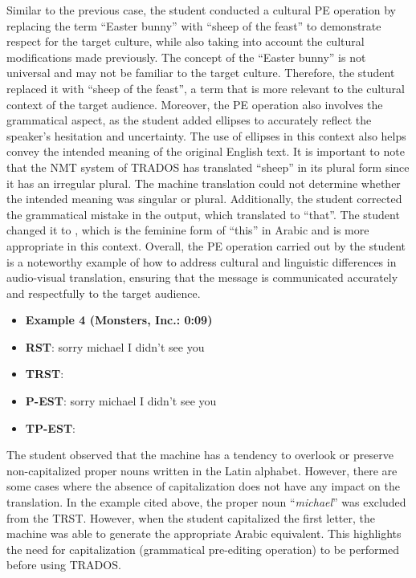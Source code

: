 \documentclass[english]{textolivre}
\begin{document}
Similar to the previous case, the student conducted a cultural PE operation by replacing the term “Easter bunny” with “sheep of the feast” to demonstrate respect for the target culture, while also taking into account the cultural modifications made previously. The concept of the “Easter bunny” is not universal and may not be familiar to the target culture. Therefore, the student replaced it with “sheep of the feast”, a term that is more relevant to the cultural context of the target audience. Moreover, the PE operation also involves the grammatical aspect, as the student added ellipses to accurately reflect the speaker’s hesitation and uncertainty. The use of ellipses in this context also helps convey the intended meaning of the original English text. It is important to note that the NMT system of TRADOS has translated “sheep” in its plural form since it has an irregular plural. The machine translation could not determine whether the intended meaning was singular or plural. Additionally, the student corrected the grammatical mistake in the output, which translated  to “that”. The student changed it to , which is the feminine form of “this” in Arabic and is more appropriate in this context. Overall, the PE operation carried out by the student is a noteworthy example of how to address cultural and linguistic differences in audio-visual translation, ensuring that the message is communicated accurately and respectfully to the target audience.

\begin{itemize}
\item \textbf{Example 4 (Monsters, Inc.: 0:09)}
\item \textbf{RST}: sorry michael I didn't see you
\item \textbf{TRST}: 
\item \textbf{P-EST}: sorry michael I didn't see you
\item \textbf{TP-EST}: 
\end{itemize}

The student observed that the machine has a tendency to overlook or preserve non-capitalized proper nouns written in the Latin alphabet. However, there are some cases where the absence of capitalization does not have any impact on the translation. In the example cited above, the proper noun “\emph{michael}” was excluded from the TRST. However, when the student capitalized the first letter, the machine was able to generate the appropriate Arabic equivalent. This highlights the need for capitalization (grammatical pre-editing operation) to be performed before using TRADOS.
\end{document}
